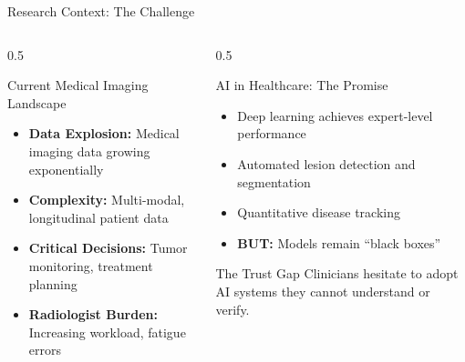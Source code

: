 \documentclass[aspectratio=169]{beamer}
\begin{document}
\begin{frame}{Research Context: The Challenge}
    \begin{columns}
        \begin{column}{0.5\textwidth}
            \begin{block}{Current Medical Imaging Landscape}
                \begin{itemize}
                    \item \textbf{Data Explosion:} Medical imaging data growing exponentially
                    \item \textbf{Complexity:} Multi-modal, longitudinal patient data
                    \item \textbf{Critical Decisions:} Tumor monitoring, treatment planning
                    \item \textbf{Radiologist Burden:} Increasing workload, fatigue errors
                \end{itemize}
            \end{block}
        \end{column}
        \begin{column}{0.5\textwidth}
            \begin{block}{AI in Healthcare: The Promise}
                \begin{itemize}
                    \item Deep learning achieves expert-level performance
                    \item Automated lesion detection and segmentation
                    \item Quantitative disease tracking
                    \item \textbf{BUT:} Models remain ``black boxes''
                \end{itemize}
            \end{block}
            \begin{alertblock}{The Trust Gap}
                Clinicians hesitate to adopt AI systems they cannot understand or verify.
            \end{alertblock}
        \end{column}
    \end{columns}
\end{frame}
\end{document}
